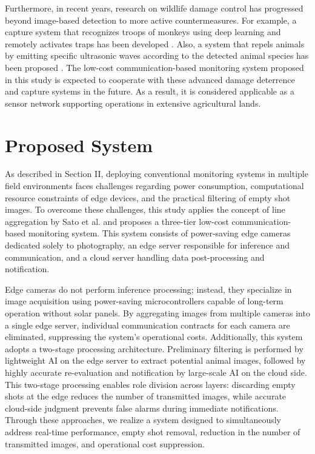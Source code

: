 \documentclass[conference]{IEEEtran}
\begin{document}
Furthermore, in recent years, research on wildlife damage control has progressed beyond image-based detection to more active countermeasures. For example, a capture system that recognizes troops of monkeys using deep learning and remotely activates traps has been developed \cite{8716170}. Also, a system that repels animals by emitting specific ultrasonic waves according to the detected animal species has been proposed \cite{11324419}. The low-cost communication-based monitoring system proposed in this study is expected to cooperate with these advanced damage deterrence and capture systems in the future. As a result, it is considered applicable as a sensor network supporting operations in extensive agricultural lands.


\section{Proposed System}
As described in Section II, deploying conventional monitoring systems in multiple field environments faces challenges regarding power consumption, computational resource constraints of edge devices, and the practical filtering of empty shot images. To overcome these challenges, this study applies the concept of line aggregation by Sato et al. \cite{Sato2022} and proposes a three-tier low-cost communication-based monitoring system. This system consists of power-saving edge cameras dedicated solely to photography, an edge server responsible for inference and communication, and a cloud server handling data post-processing and notification.

Edge cameras do not perform inference processing; instead, they specialize in image acquisition using power-saving microcontrollers capable of long-term operation without solar panels. By aggregating images from multiple cameras into a single edge server, individual communication contracts for each camera are eliminated, suppressing the system's operational costs. Additionally, this system adopts a two-stage processing architecture. Preliminary filtering is performed by lightweight AI on the edge server to extract potential animal images, followed by highly accurate re-evaluation and notification by large-scale AI on the cloud side. This two-stage processing enables role division across layers: discarding empty shots at the edge reduces the number of transmitted images, while accurate cloud-side judgment prevents false alarms during immediate notifications. Through these approaches, we realize a system designed to simultaneously address real-time performance, empty shot removal, reduction in the number of transmitted images, and operational cost suppression.
\end{document}
